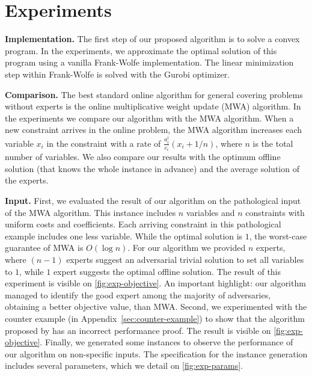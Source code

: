 
\section{Experiments}

\textbf{Implementation.} The first step of our proposed algorithm is to solve a convex program. In the experiments, we approximate the optimal solution of this program using a vanilla Frank-Wolfe implementation. The linear minimization step within Frank-Wolfe is solved with the Gurobi optimizer.

\textbf{Comparison.} The best standard online algorithm for general covering problems without experts is the online multiplicative weight update (MWA) algorithm. In the experiments we compare our algorithm with the MWA algorithm. When a new constraint arrives in the online problem, the MWA algorithm increases each variable $x_i$ in the constraint with a rate of $\frac{a^t_i}{c_i}(x_i + 1/n)$, where $n$ is the total number of variables. We also compare our results with the optimum offline solution (that knows the whole instance in advance) and the average solution of the experts.

\textbf{Input.} First, we evaluated the result of our algorithm on the pathological input of the MWA algorithm. This instance includes $n$ variables and $n$ constraints with uniform costs and coefficients. Each arriving constraint in this pathological example includes one less variable. While the optimal solution is $1$, the worst-case guarantee of MWA is $O(\log n)$. For our algorithm we provided $n$ experts, where $(n-1)$ experts suggest an adversarial trivial solution to set all variables to $1$, while $1$ expert suggests the optimal offline solution. The result of this experiment is visible on \cref{fig:exp-objective}. An important highlight: our algorithm managed to identify the good expert among the majority of adversaries, obtaining a better objective value, than MWA. Second, we experimented with the counter example (in Appendix~\ref{sec:counter-example}) to show that the algorithm proposed by \cite{AnandGe22:Online-Algorithms} has an incorrect performance proof. The result is visible on \cref{fig:exp-objective}. Finally, we generated some instances to observe the performance of our algorithm on non-specific inputs.
The specification for the instance generation includes several parameters, which we detail on \cref{fig:exp-params}.

